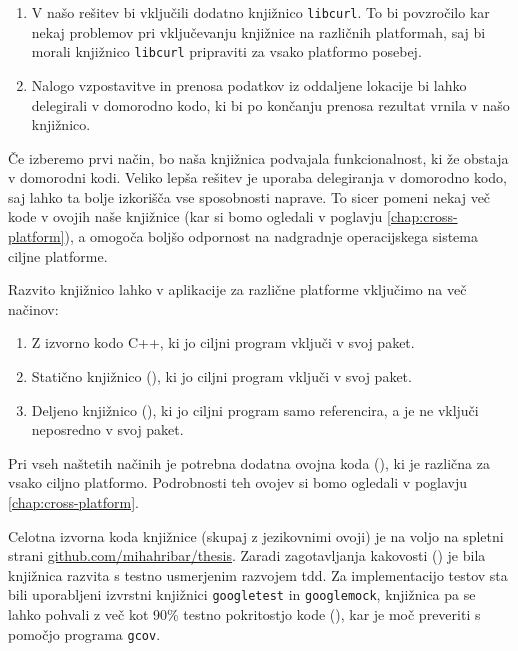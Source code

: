 \begin{enumerate}
  \item V našo rešitev bi vključili dodatno knjižnico \texttt{libcurl}. To bi povzročilo kar nekaj problemov pri vključevanju knjižnice na različnih platformah, saj bi morali knjižnico \texttt{libcurl} pripraviti za vsako platformo posebej.
  \item Nalogo vzpostavitve in prenosa podatkov iz oddaljene lokacije bi lahko delegirali v domorodno kodo, ki bi po končanju prenosa rezultat vrnila v našo knjižnico.
\end{enumerate}

Če izberemo prvi način, bo naša knjižnica podvajala funkcionalnost, ki že obstaja v domorodni kodi. Veliko lepša rešitev je uporaba delegiranja v domorodno kodo, saj lahko ta bolje izkorišča vse sposobnosti naprave. To sicer pomeni nekaj več kode v ovojih naše knjižnice (kar si bomo ogledali v poglavju \ref{chap:cross-platform}), a omogoča boljšo odpornost na nadgradnje operacijskega sistema ciljne platforme.

Razvito knjižnico lahko v aplikacije za različne platforme vključimo na več načinov:

\begin{enumerate}
  \item Z izvorno kodo C++, ki jo ciljni program vključi v svoj paket.
  \item Statično knjižnico (), ki jo ciljni program vključi v svoj paket.
  \item Deljeno knjižnico (), ki jo ciljni program samo referencira, a je ne vključi neposredno v svoj paket.
\end{enumerate}

Pri vseh naštetih načinih je potrebna dodatna ovojna koda (), ki je različna za vsako ciljno platformo. Podrobnosti teh ovojev si bomo ogledali v poglavju \ref{chap:cross-platform}.

Celotna izvorna koda knjižnice (skupaj z jezikovnimi ovoji) je na voljo na spletni strani \href{https://github.com/mihahribar/thesis}{github.com/mihahribar/thesis}. Zaradi zagotavljanja kakovosti () je bila knjižnica razvita s testno usmerjenim razvojem \gls{tdd}\cite{tdd-cpp}. Za implementacijo testov sta bili uporabljeni izvrstni knjižnici \texttt{googletest}\cite{googletest} in \texttt{googlemock}\cite{googlemock}, knjižnica pa se lahko pohvali z več kot 90\% testno pokritostjo kode (), kar je moč preveriti s pomočjo programa \texttt{gcov}.

